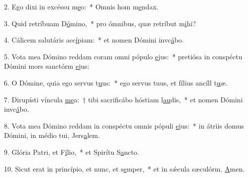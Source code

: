 2. Ego dixi in excéssu m\uline{e}o:~* Omnis hom m\uline{e}ndax.\par 
3. Quid retríbuam D\uline{ó}mino,~* pro ómnibus, quæ retríbut m\uline{i}hi?\par 
4. Cálicem salutáris acc\uline{í}piam:~* et nomen Dómini invc\uline{á}bo.\par 
5. Vota mea Dómino reddam coram omni pópulo \uline{e}jus:~* pretiósa in conspéctu Dómini mors sanctórm \uline{e}jus:\par 
6. O Dómine, quia ego servus t\uline{u}us:~* ego servus tuus, et fílius ancíll t\uline{u}æ.\par 
7. Dirupísti víncula \uline{me}a:~† tibi sacrificábo hóstiam l\uline{au}dis,~* et nomen Dómini invc\uline{á}bo.\par 
8. Vota mea Dómino reddam in conspéctu omnis pópuli \uline{e}jus:~* in átriis domus Dómini, in médio tui, Jers\uline{a}lem.\par 
9. Glória Patri, et F\uline{í}lio,~* et Spirítu S\uline{a}ncto.\par 
10. Sicut erat in princípio, et nunc, et s\uline{e}mper,~* et in sǽcula sæculórm. \uline{A}men.\par 
